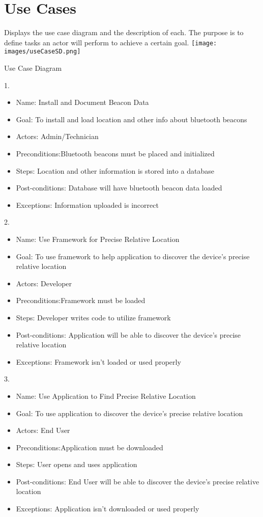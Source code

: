 \chapter{Use Cases}
Displays the use case diagram and the description of each. The purpose is to define tasks an actor will perform to achieve a certain goal.
\texttt{[image: images/useCaseSD.png]}
\caption{Use Case Diagram}
1.
\begin{itemize}
\item Name: Install and Document Beacon Data
\item Goal: To install and load location and other info about bluetooth beacons
\item Actors: Admin/Technician
\item Preconditions:Bluetooth beacons must be placed and initialized
\item Steps: Location and other information is stored into a database
\item Post-conditions: Database will have bluetooth beacon data loaded
\item Exceptions: Information uploaded is incorrect
\end{itemize}
2.
\begin{itemize}
\item Name: Use Framework for Precise Relative Location
\item Goal: To use framework to help application to discover the device's precise relative location
\item Actors: Developer
\item Preconditions:Framework must be loaded
\item Steps: Developer writes code to utilize framework
\item Post-conditions: Application will be able to discover the device's precise relative location
\item Exceptions: Framework isn't loaded or used properly
\end{itemize}
3.
\begin{itemize}
\item Name: Use Application to Find Precise Relative Location
\item Goal: To use application to discover the device's precise relative location
\item Actors: End User
\item Preconditions:Application must be downloaded
\item Steps: User opens and uses application
\item Post-conditions: End User will be able to discover the device's precise relative location
\item Exceptions: Application isn't downloaded or used properly
\end{itemize}
